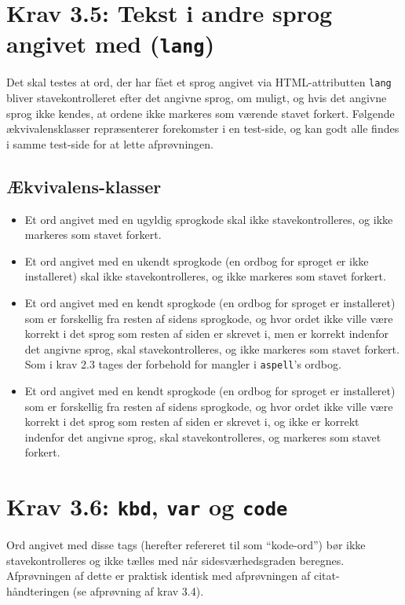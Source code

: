 \documentclass[a4paper,oneside,article, titlepage]{memoir}
\begin{document}
\section*{Krav 3.5: Tekst i andre sprog angivet med
  (\texttt{lang})}

Det skal testes at ord, der har fået et sprog angivet via
HTML-attributten \texttt{lang} bliver stavekontrolleret efter det
angivne sprog, om muligt, og hvis det angivne sprog ikke kendes, at
ordene ikke markeres som værende stavet forkert. Følgende
ækvivalensklasser repræsenterer forekomster i en test-side, og kan
godt alle findes i samme test-side for at lette afprøvningen.

\subsection{Ækvivalens-klasser}
\begin{itemize}
\item Et ord angivet med en ugyldig sprogkode skal ikke
  stavekontrolleres, og ikke markeres som stavet forkert.
\item Et ord angivet med en ukendt sprogkode (en ordbog for sproget er
  ikke installeret) skal ikke stavekontrolleres, og ikke markeres som
  stavet forkert.
\item Et ord angivet med en kendt sprogkode (en ordbog for sproget er
  installeret) som er forskellig fra resten af sidens sprogkode, og
  hvor ordet ikke ville være korrekt i det sprog som resten af siden
  er skrevet i, men er korrekt indenfor det angivne sprog, skal
  stavekontrolleres, og ikke markeres som stavet forkert. Som i krav
  2.3 tages der forbehold for mangler i \texttt{aspell}'s ordbog.
\item Et ord angivet med en kendt sprogkode (en ordbog for sproget er
  installeret) som er forskellig fra resten af sidens sprogkode, og
  hvor ordet ikke ville være korrekt i det sprog som resten af siden
  er skrevet i, og ikke er korrekt indenfor det angivne sprog, skal
  stavekontrolleres, og markeres som stavet forkert.
\end{itemize}

\section*{Krav 3.6: \texttt{kbd}, \texttt{var} og \texttt{code}}

Ord angivet med disse tags (herefter refereret til som ``kode-ord'')
bør ikke stavekontrolleres og ikke tælles med når sidesværhedsgraden
beregnes. Afprøvningen af dette er praktisk identisk med afprøvningen
af citat-håndteringen (se afprøvning af krav 3.4).
\end{document}
